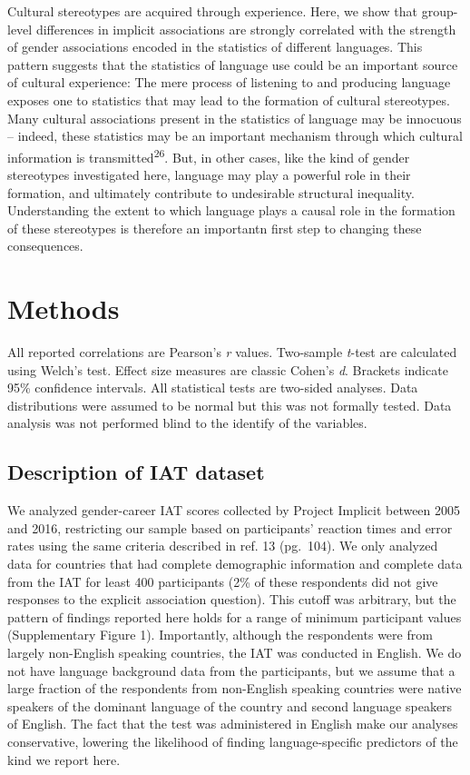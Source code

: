 \documentclass[11pt]{wlscirep}
\begin{document}
Cultural stereotypes are acquired through experience. Here, we show that
group-level differences in implicit associations are strongly correlated with the strength of gender associations encoded in the statistics of different languages. This pattern suggests that the statistics of language use could be an important source of cultural experience: The mere process of
listening to and producing language exposes one to statistics that may
lead to the formation of cultural stereotypes. Many cultural
associations present in the statistics of language may be innocuous --
indeed, these statistics may be an important mechanism through which
cultural information is transmitted\textsuperscript{26}. But, in
other cases, like the kind of gender stereotypes investigated here,
language may play a powerful role in their formation, and ultimately
contribute to undesirable structural inequality. Understanding the extent to which language plays a causal role in the formation of these stereotypes is therefore an importantn first step to changing these consequences.

\section*{Methods}

All reported correlations are Pearson's \emph{r} values.  Two-sample \emph{t}-test are calculated using Welch's test. Effect size measures are classic Cohen's \emph{d}.  Brackets indicate 95\% confidence intervals. All statistical tests are two-sided analyses. Data distributions were assumed to be normal but this was not formally tested. Data analysis was not performed blind to the identify of the variables.
 
\subsection*{Description of IAT dataset}

We analyzed gender-career IAT scores collected by Project Implicit
between 2005 and 2016, restricting our sample based on participants'
reaction times and error rates using the same criteria described in ref. 13 (pg.~104). We only analyzed data for
countries that had complete demographic information and complete data
from the IAT for least 400 participants (2\% of these respondents did
not give responses to the explicit association question). This cutoff was
arbitrary, but the pattern of findings reported here holds for a range
of minimum participant values (Supplementary Figure 1).  Importantly, although the
respondents were from largely non-English speaking countries, the IAT
was conducted in English. We do not have language background data from
the participants, but we assume that a large fraction of the respondents
from non-English speaking countries were native speakers of the dominant
language of the country and second language speakers of English. The fact that the test was administered in English make our analyses conservative, lowering the likelihood of finding language-specific predictors of the kind we report here.
\end{document}
